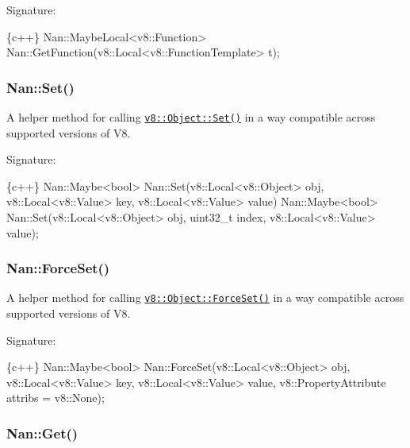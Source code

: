 Signature\+:


\begin{DoxyCode}
\{c++\}
Nan::MaybeLocal<v8::Function> Nan::GetFunction(v8::Local<v8::FunctionTemplate> t);
\end{DoxyCode}


\label{_api_nan_set}%
 \subsubsection*{Nan\+::\+Set()}

A helper method for calling \href{https://v8docs.nodesource.com/io.js-3.0/db/d85/classv8_1_1_object.html#a67604ea3734f170c66026064ea808f20}{\tt {\ttfamily v8\+::\+Object\+::\+Set()}} in a way compatible across supported versions of V8.

Signature\+:


\begin{DoxyCode}
\{c++\}
Nan::Maybe<bool> Nan::Set(v8::Local<v8::Object> obj,
                          v8::Local<v8::Value> key,
                          v8::Local<v8::Value> value)
Nan::Maybe<bool> Nan::Set(v8::Local<v8::Object> obj,
                          uint32\_t index,
                          v8::Local<v8::Value> value);
\end{DoxyCode}


\label{_api_nan_force_set}%
 \subsubsection*{Nan\+::\+Force\+Set()}

A helper method for calling \href{https://v8docs.nodesource.com/io.js-3.0/db/d85/classv8_1_1_object.html#a796b7b682896fb64bf1872747734e836}{\tt {\ttfamily v8\+::\+Object\+::\+Force\+Set()}} in a way compatible across supported versions of V8.

Signature\+:


\begin{DoxyCode}
\{c++\}
Nan::Maybe<bool> Nan::ForceSet(v8::Local<v8::Object> obj,
                               v8::Local<v8::Value> key,
                               v8::Local<v8::Value> value,
                               v8::PropertyAttribute attribs = v8::None);
\end{DoxyCode}


\label{_api_nan_get}%
 \subsubsection*{Nan\+::\+Get()}

